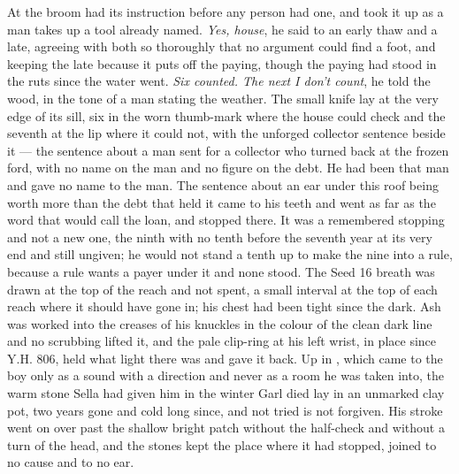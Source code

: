 \scenebreak

At  the broom had its instruction before any person had one, and  took it up as a man takes up a tool already named. \emph{Yes, house}, he said to an early thaw and a late, agreeing with both so thoroughly that no argument could find a foot, and keeping the late because it puts off the paying, though the paying had stood in the ruts since the water went. \emph{Six counted. The next I don't count}, he told the wood, in the tone of a man stating the weather. The small knife lay at the very edge of its sill, six in the worn thumb-mark where the house could check and the seventh at the lip where it could not, with the unforged collector sentence beside it --- the sentence about a man sent for a collector who turned back at the frozen ford, with no name on the man and no figure on the debt. He had been that man and gave no name to the man. The sentence about an ear under this roof being worth more than the debt that held it came to his teeth and went as far as the word that would call the loan, and stopped there. It was a remembered stopping and not a new one, the ninth with no tenth before the seventh year at its very end and still ungiven; he would not stand a tenth up to make the nine into a rule, because a rule wants a payer under it and none stood. The Seed 16 breath was drawn at the top of the reach and not spent, a small interval at the top of each reach where it should have gone in; his chest had been tight since the dark. Ash was worked into the creases of his knuckles in the colour of the clean dark line and no scrubbing lifted it, and the pale clip-ring at his left wrist, in place since Y.H. 806, held what light there was and gave it back. Up in , which came to the boy only as a sound with a direction and never as a room he was taken into, the warm stone Sella had given him in the winter Garl died lay in an unmarked clay pot, two years gone and cold long since, and not tried is not forgiven. His stroke went on over  past the shallow bright patch without the half-check and without a turn of the head, and the stones kept the place where it had stopped, joined to no cause and to no ear.

